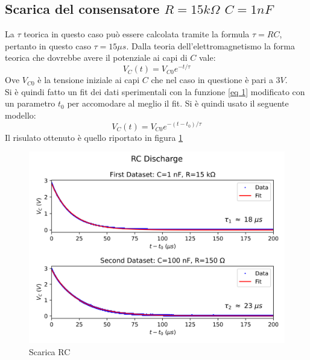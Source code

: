 \subsection{Scarica del consensatore $R=15k\Omega $ $C=1nF$}
La $\tau$ teorica in questo caso può essere calcolata tramite la formula $\tau=RC$, pertanto in questo caso $\tau=15\mu s$. Dalla teoria dell'elettromagnetismo la forma teorica che dovrebbe avere il potenziale ai capi di $C$ vale:
\begin{equation}
\label{eq 1}
    V_C(t)=V_{C0}e^{-t/\tau}
\end{equation}
Ove $V_{C0}$ è la tensione iniziale ai capi $C$ che nel caso in questione è pari a $3V$.\\
Si è quindi fatto un fit dei dati sperimentali con la funzione \ref{eq 1} modificato con un parametro $t_0$ per accomodare al meglio il fit. Si è quindi usato il seguente modello:
\begin{equation}
    V_C(t)=V_{C0}e^{-(t-t_0)/\tau}
\end{equation}
Il risulato ottenuto è quello riportato in figura \ref{fig:Scarica RC1}
\begin{figure}
    \centering
    \includegraphics[trim=0 160 0 30, clip, width=\textwidth]{scarica_RC.png}
    \caption{Scarica RC}
    \label{fig:Scarica RC1}
\end{figure}
